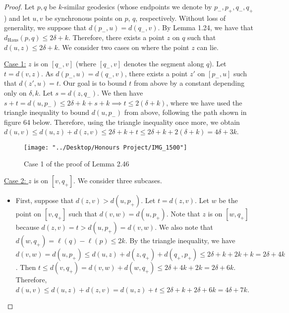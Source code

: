 \documentclass[12pt]{article}
\newcommand{\vs}{\vskip10pt}
\begin{document}
	\begin{proof}
		
		Let $p,q$ be $k$-similar geodesics (whose endpoints we denote by $p_{-}, p_{+}, q_{-}, q_{+}$) and let $u,v$ be synchronous points on $p$, $q$, respectively. Without loss of generality, we suppose that $d(p_{-}, u) = d(q_{-}, v)$. By Lemma 1.24, we have that $d_{\text{Haus}}(p,q) \leq 2\delta + k$. Therefore, there exists a point $z$ on $q$ such that $d(u,z) \leq 2\delta + k$. We consider two cases on where the point $z$ can lie. 
		
		\vs 
		
		\underline{Case 1:} $z$ is on $[q_{-}, v]$ (where $[q_{-}, v]$ denotes the segment along $q$). Let $t = d(v,z)$. As $d(p_{-}, u) = d(q_{-}, v)$, there exists a point $z'$ on $[p_{-}, u]$ such that $d(z', u) = t$. Our goal is to bound $t$ from above by a constant depending only on $\delta, k$. Let $s = d(z, q_{-})$. We then have $s + t = d(u, p_{-}) \leq 2 \delta + k + s + k \implies t \leq 2(\delta + k)$, where we have used the triangle inequality to bound $d(u, p_{-})$ from above, following the path shown in figure 64 below. Therefore, using the triangle inequality once more, we obtain $d(u,v) \leq d(u,z) + d(z,v) \leq 2\delta + k + t \leq 2\delta + k + 2(\delta + k) = 4\delta + 3k$. 
		
		
\begin{figure} [H]
	\centering
	\texttt{[image: "../Desktop/Honours Project/IMG\_1500"]}
	\caption{Case 1 of the proof of Lemma 2.46}
	\label{fig:img1500}
\end{figure}
		
		\vs 
		
		\underline{Case 2: } $z$ is on $[v, q_{+}]$. We consider three subcases. 
		
		\begin{itemize}
			\item First, suppose that $d(z, v) > d(u, p_{+})$. Let $t = d(z,v)$. Let $w$ be the point on $[v, q_{+}]$ such that $d(v, w) = d(u, p_{+})$. Note that $z$ is on $[w, q_{+}]$ because $d(z,v) = t > d(u, p_{+}) = d(v,w)$. We also note that $d(w, q_{+}) = \ell(q) - \ell(p) \leq 2k$. By the triangle inequality, we have $d(v,w) = d(u, p_{+}) \leq d(u, z) + d(z, q_{+}) + d(q_{+}, p_{+}) \leq 2 \delta + k + 2k + k = 2 \delta + 4k$. Then $t \leq d(v, q_{+}) = d(v,w) + d(w, q_{+}) \leq 2 \delta + 4k + 2k = 2 \delta + 6k$. Therefore, $d(u,v) \leq d(u,z) + d(z,v) = d(u,z) + t \leq 2 \delta + k + 2 \delta + 6k = 4 \delta + 7k$.
			

\end{itemize}
\end{proof}
\end{document}
